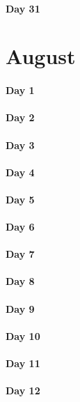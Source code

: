 \documentclass[UTF8,a4paper,8pt]{ctexart}
\begin{document}
 	 \paragraph{Day 31      \quad     }
\section{August}
 	 \paragraph{Day 1       \quad     }
 	 \paragraph{Day 2       \quad     }
 	 \paragraph{Day 3       \quad     }
 	 \paragraph{Day 4       \quad     }
 	 \paragraph{Day 5       \quad     }
 	 \paragraph{Day 6       \quad     }
 	 \paragraph{Day 7       \quad     }
 	 \paragraph{Day 8       \quad     }
 	 \paragraph{Day 9       \quad     }
 	 \paragraph{Day 10      \quad     }
 	 \paragraph{Day 11      \quad     }
 	 \paragraph{Day 12      \quad     }
\end{document}
